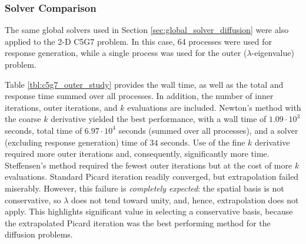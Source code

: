 \subsubsection{Solver Comparison}

The same global solvers used in 
Section \ref{sec:global_solver_diffusion} were also applied 
to the 2-D C5G7 problem.  In this case, 64 processes were used 
for response generation, while a
single process was used for the outer ($\lambda$-eigenvalue) problem.

Table \ref{tbl:c5g7_outer_study} provides the wall time,
as well as the total and response time summed over all 
processes.  In addition, the number of inner iterations,
outer iterations, and $k$ evaluations are included. Newton's method with the 
coarse $k$ derivative yielded the best performance, with a wall 
time of $1.09\cdot 10^3$ seconds, total 
time of $6.97\cdot 10^4$ seconds (summed over 
all processes), and a solver (excluding response generation) time of 
$34$ seconds. Use of 
the fine $k$ derivative required more outer iterations and, consequently, 
significantly more time.  Steffensen's method required the 
fewest outer iterations but at the 
cost of more $k$ evaluations.  Standard Picard iteration 
readily converged, but extrapolation
failed miserably.  However, this failure is {\it completely expected}: 
the spatial basis is not conservative, so $\lambda$ does not 
tend toward unity, and, hence, extrapolation does not apply.  This 
highlights significant value in selecting a conservative basis, 
because the extrapolated Picard iteration was the best performing 
method for the diffusion problems.

